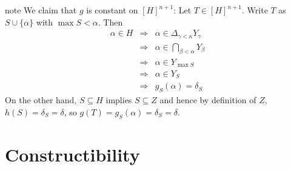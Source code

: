 \documentclass[letterpaper,10pt,english]{jupyterBook}
\begin{document}
\begin{sphinxadmonition}{note}
\sphinxAtStartPar
We claim that \(g\) is constant on \([H]^{n+1}\): Let \(T \in [H]^{n+1}\). Write \(T\) as \(S \cup \{\alpha\}\) with \(\max S < \alpha\). Then
\begin{align*}
    \alpha \in H & \Rightarrow  & \alpha \in \Delta_{\gamma < \kappa} Y_\gamma \\
                 & \Rightarrow  & \alpha \in \bigcap_{\beta < \alpha} Y_\beta \\
                 & \Rightarrow  & \alpha \in Y_{\max S} \\
                 & \Rightarrow  & \alpha \in Y_S \\
                 & \Rightarrow  & g_S(\alpha) = \delta_S
\end{align*}
\sphinxAtStartPar
On the other hand, \(S \subseteq H\) implies \(S \subseteq Z\) and hence by definition of \(Z\), \(h(S) = \delta_S = \delta\), so \(g(T) = g_S(\alpha) = \delta_S = \delta\).
\end{sphinxadmonition}

\sphinxstepscope


\part{Constructibility}

\sphinxstepscope
\end{document}
